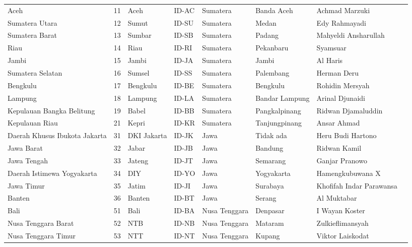 \begin{landscape}
\begin{longtable}{p{3.5cm}cllllll}
Aceh & 11 & Aceh & ID-AC & Sumatera & Banda Aceh & Achmad Marzuki \\
Sumatera Utara & 12 & Sumut & ID-SU & Sumatera & Medan & Edy Rahmayadi \\
Sumatera Barat & 13 & Sumbar & ID-SB & Sumatera & Padang & Mahyeldi Ansharullah \\
Riau & 14 & Riau & ID-RI & Sumatera & Pekanbaru & Syamsuar \\
Jambi & 15 & Jambi & ID-JA & Sumatera & Jambi & Al Haris \\
Sumatera Selatan & 16 & Sumsel & ID-SS & Sumatera & Palembang & Herman Deru \\
Bengkulu & 17 & Bengkulu & ID-BE & Sumatera & Bengkulu & Rohidin Mersyah \\
Lampung & 18 & Lampung & ID-LA & Sumatera & Bandar Lampung & Arinal Djunaidi \\
Kepulauan Bangka Belitung & 19 & Babel & ID-BB & Sumatera & Pangkalpinang & Ridwan Djamaluddin \\
Kepulauan Riau & 21 & Kepri & ID-KR & Sumatera & Tanjungpinang & Ansar Ahmad \\
Daerah Khusus Ibukota Jakarta & 31 & DKI Jakarta & ID-JK & Jawa & Tidak ada & Heru Budi Hartono \\
Jawa Barat & 32 & Jabar & ID-JB & Jawa & Bandung & Ridwan Kamil \\
Jawa Tengah & 33 & Jateng & ID-JT & Jawa & Semarang & Ganjar Pranowo \\
Daerah Istimewa Yogyakarta & 34 & DIY & ID-YO & Jawa & Yogyakarta & Hamengkubuwana X \\
Jawa Timur & 35 & Jatim & ID-JI & Jawa & Surabaya & Khofifah Indar Parawansa \\
Banten & 36 & Banten & ID-BT & Jawa & Serang & Al Muktabar \\
Bali & 51 & Bali & ID-BA & Nusa Tenggara & Denpasar & I Wayan Koster \\
Nusa Tenggara Barat & 52 & NTB & ID-NB & Nusa Tenggara & Mataram & Zulkieflimansyah \\
Nusa Tenggara Timur & 53 & NTT & ID-NT & Nusa Tenggara & Kupang & Viktor Laiskodat \\


\end{longtable}
\end{landscape}
